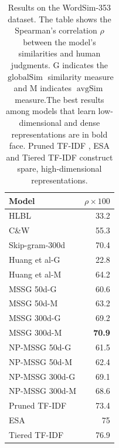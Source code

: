 \documentclass[11pt,a4paper]{article}
\DeclareMathOperator*{\avgSim}{avgSim}
\DeclareMathOperator*{\globalSim}{globalSim}
\begin{document}
\begin{table}
\centering
\begin{tabular}{|l|r|}
\hline 
Model & $\rho \times 100 $ \\ \hline \hline
HLBL & 33.2 \\ \hline
C\&W & 55.3 \\ \hline
Skip-gram-300d & 70.4 \\ \hline
Huang et al-G & 22.8 \\ \hline
Huang et al-M & 64.2 \\ \hline
MSSG 50d-G & 60.6 \\ \hline
MSSG 50d-M & 63.2 \\ \hline
MSSG 300d-G& 69.2 \\ \hline
MSSG 300d-M& \textbf{70.9} \\ \hline  
NP-MSSG 50d-G & 61.5 \\ \hline
NP-MSSG 50d-M & 62.4 \\ \hline
NP-MSSG 300d-G& 69.1 \\ \hline
NP-MSSG 300d-M& 68.6 \\ \hline  \hline
Pruned TF-IDF & 73.4 \\ \hline 
ESA & 75 \\ \hline
Tiered TF-IDF & 76.9 \\ \hline
\end{tabular}
\caption{Results on the WordSim-353 dataset. The table shows the Spearman’s correlation $\rho$ between the model's similarities and human judgments.  G indicates the $\globalSim$ similarity measure and M indicates $\avgSim$ measure.The best results among models  that learn low-dimensional and dense representations are in bold face. Pruned TF-IDF \cite{reisinger:2010b}, ESA \cite{gabrilovich:2007} and Tiered TF-IDF \cite{reisinger:2010a} construct spare, high-dimensional representations.}
\label{table:ws353-task}
\end{table}
\end{document}
